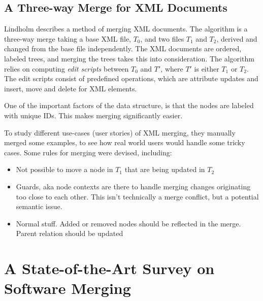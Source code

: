 \documentclass[a4paper,english]{ifimaster}
\begin{document}
\subsection{A Three-way Merge for XML Documents}%
\label{sub:_a_three_way_merge_for_xml_documents}

Lindholm describes a method of merging XML documents. The algorithm is a three-way merge taking a base XML file, $T_0$, and two files $T_1$ and $T_2$, derived and changed from the base file independently. The XML documents are ordered, labeled trees, and merging the trees takes this into consideration. The algorithm relies on computing \textit{edit scripts} between $T_0$ and $T'$, where $T'$ is either $T_1$ or $T_2$. The edit scripts consist of predefined operations, which are attribute updates and insert, move and delete for XML elements.

One of the important factors of the data structure, is that the nodes are labeled with unique IDs. This makes merging significantly easier.

To study different use-cases (user stories) of XML merging, they manually merged some examples, to see how real world users would handle some tricky cases. Some rules for merging were devised, including:

\begin{itemize}
	\item Not possible to move a node in $T_1$ that are being updated in $T_2$
	\item Guards, aka node contexts are there to handle merging changes originating too close to each other. This isn't technically a merge conflict, but a potential semantic issue.
	\item Normal stuff. Added or removed nodes should be reflected in the merge. Parent relation should be updated
\end{itemize}


\section{A State-of-the-Art Survey on Software Merging}%
\label{sec:a_state_of_the_art_survey_on_software_merging}



\backmatter{}

\printbibliography{}
\end{document}
